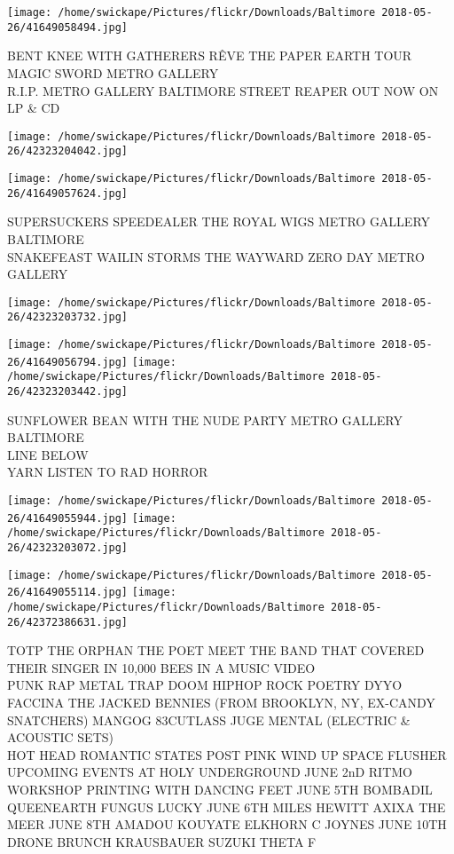 \documentclass[10pt,letterpaper]{article}
\begin{document}
\texttt{[image: /home/swickape/Pictures/flickr/Downloads/Baltimore 2018-05-26/41649058494.jpg]}

BENT KNEE WITH GATHERERS RÊVE THE PAPER EARTH TOUR\\
MAGIC SWORD METRO GALLERY\\
R.I.P. METRO GALLERY BALTIMORE STREET REAPER OUT NOW ON LP \& CD\\
\pagebreak

\texttt{[image: /home/swickape/Pictures/flickr/Downloads/Baltimore 2018-05-26/42323204042.jpg]}

\vspace{0.25in}
\texttt{[image: /home/swickape/Pictures/flickr/Downloads/Baltimore 2018-05-26/41649057624.jpg]}

SUPERSUCKERS SPEEDEALER THE ROYAL WIGS METRO GALLERY BALTIMORE\\
SNAKEFEAST WAILIN STORMS THE WAYWARD ZERO DAY METRO GALLERY\\
\pagebreak

\texttt{[image: /home/swickape/Pictures/flickr/Downloads/Baltimore 2018-05-26/42323203732.jpg]}

\vspace{0.25in}
\texttt{[image: /home/swickape/Pictures/flickr/Downloads/Baltimore 2018-05-26/41649056794.jpg]}
\texttt{[image: /home/swickape/Pictures/flickr/Downloads/Baltimore 2018-05-26/42323203442.jpg]}

SUNFLOWER BEAN WITH THE NUDE PARTY METRO GALLERY BALTIMORE\\
LINE BELOW\\
YARN LISTEN TO RAD HORROR\\
\pagebreak

\texttt{[image: /home/swickape/Pictures/flickr/Downloads/Baltimore 2018-05-26/41649055944.jpg]}
\texttt{[image: /home/swickape/Pictures/flickr/Downloads/Baltimore 2018-05-26/42323203072.jpg]}

\texttt{[image: /home/swickape/Pictures/flickr/Downloads/Baltimore 2018-05-26/41649055114.jpg]}
\texttt{[image: /home/swickape/Pictures/flickr/Downloads/Baltimore 2018-05-26/42372386631.jpg]}

TOTP THE ORPHAN THE POET MEET THE BAND THAT COVERED THEIR SINGER IN 10,000 BEES IN A MUSIC VIDEO\\
PUNK RAP METAL TRAP DOOM HIPHOP ROCK POETRY DYYO FACCINA THE JACKED BENNIES (FROM BROOKLYN, NY, EX{-}CANDY SNATCHERS) MANGOG 83CUTLASS JUGE MENTAL (ELECTRIC \& ACOUSTIC SETS)\\
HOT HEAD ROMANTIC STATES POST PINK WIND UP SPACE FLUSHER\\
UPCOMING EVENTS AT HOLY UNDERGROUND JUNE 2nD RITMO WORKSHOP PRINTING WITH DANCING FEET JUNE 5TH BOMBADIL QUEENEARTH FUNGUS LUCKY JUNE 6TH MILES HEWITT AXIXA THE MEER JUNE 8TH AMADOU KOUYATE ELKHORN C JOYNES JUNE 10TH DRONE BRUNCH KRAUSBAUER SUZUKI THETA F\\
\pagebreak
\end{document}
